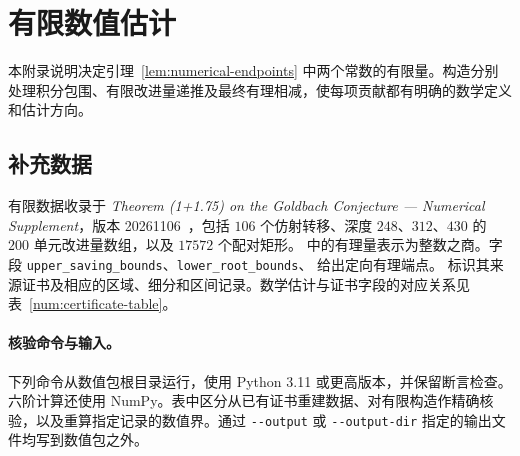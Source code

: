 \section{有限数值估计}\label{app:numeric}

本附录说明决定引理~\ref{lem:numerical-endpoints} 中两个常数的有限量。构造分别处理积分包围、有限改进量递推及最终有理相减，使每项贡献都有明确的数学定义和估计方向。

\subsection{补充数据}
有限数据收录于 \emph{Theorem (1+1.75) on the Goldbach Conjecture --- Numerical Supplement}，版本 20261106~\cite{ChanSupplement}，包括 $106$ 个仿射转移、深度 $248$、$312$、$430$ 的 $200$ 单元改进量数组，以及 $17572$ 个配对矩形。 中的有理量表示为整数之商。字段 \texttt{upper\_saving\_bounds}、\texttt{lower\_root\_bounds}、 给出定向有理端点。 标识其来源证书及相应的区域、细分和区间记录。数学估计与证书字段的对应关系见表~\ref{num:certificate-table}。

\hypertarget{num:verification-scope}{}
\paragraph{核验命令与输入。}
下列命令从数值包根目录运行，使用 Python 3.11 或更高版本，并保留断言检查。六阶计算还使用 NumPy。表中区分从已有证书重建数据、对有限构造作精确核验，以及重算指定记录的数值界。通过 \texttt{-{}-output} 或 \texttt{-{}-output-dir} 指定的输出文件均写到数值包之外。

